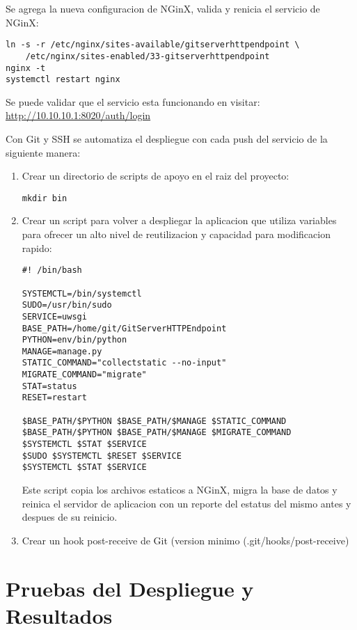 Se agrega la nueva configuracion de NGinX, valida y renicia el servicio de NGinX:
\begin{lstlisting}
ln -s -r /etc/nginx/sites-available/gitserverhttpendpoint \ 
    /etc/nginx/sites-enabled/33-gitserverhttpendpoint
nginx -t
systemctl restart nginx
\end{lstlisting}

Se puede validar que el servicio esta funcionando en visitar: \url{http://10.10.10.1:8020/auth/login}

Con Git y SSH se automatiza el despliegue con cada push del servicio de la siguiente manera:
\begin{enumerate}
	\item Crear un directorio de scripts de apoyo en el raiz del proyecto:
    \begin{lstlisting}
mkdir bin
    \end{lstlisting}
    \item Crear un script para volver a despliegar la aplicacion que utiliza variables para ofrecer un alto nivel de reutilizacion y capacidad para modificacion rapido:
    \begin{lstlisting}
#! /bin/bash

SYSTEMCTL=/bin/systemctl
SUDO=/usr/bin/sudo
SERVICE=uwsgi
BASE_PATH=/home/git/GitServerHTTPEndpoint
PYTHON=env/bin/python
MANAGE=manage.py
STATIC_COMMAND="collectstatic --no-input"
MIGRATE_COMMAND="migrate"
STAT=status
RESET=restart

$BASE_PATH/$PYTHON $BASE_PATH/$MANAGE $STATIC_COMMAND
$BASE_PATH/$PYTHON $BASE_PATH/$MANAGE $MIGRATE_COMMAND
$SYSTEMCTL $STAT $SERVICE
$SUDO $SYSTEMCTL $RESET $SERVICE
$SYSTEMCTL $STAT $SERVICE
    \end{lstlisting}
    Este script copia los archivos estaticos a NGinX, migra la base de datos y reinica el servidor de aplicacion con un reporte del estatus del mismo antes y despues de su reinicio.
    \item Crear un hook post-receive de Git (version minimo  (.git/hooks/post-receive)
\end{enumerate}


\section{Pruebas del Despliegue y Resultados}

